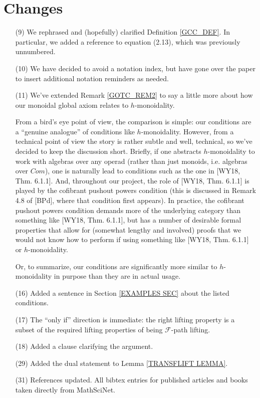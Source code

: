\documentclass[a4paper,10pt
]{article}%
\numberwithin{equation}{section}
\numberwithin{figure}{section}
\theoremstyle{definition} %
\newcommand{\F}{\ensuremath{\mathcal F}}
\newcommand{\1}{\ensuremath{\mathbbm 1}}%
\begin{document}
\section{Changes}

\begin{enumerate}
\item[(9)] We rephrased and (hopefully) clarified Definition \ref{GCC_DEF}. In particular, we added a reference to equation (2.13), which was previously unnumbered.
\item[(10)] We have decided to avoid a notation index, but have gone over the paper to insert additional notation reminders as needed.
\item[(11)] We've extended Remark \ref{GOTC_REM2} to say a little more about how our monoidal global axiom relates to 
$h$-monoidality.

From a bird's eye point of view, the comparison is simple: our conditions are a ``genuine analogue'' of conditions like $h$-monoidality. 
However, from a technical point of view the story is rather subtle and well, technical, so we've decided to keep the discussion short. 
Briefly, if one abstracts $h$-monoidality to work with 
algebras over any operad (rather than just monoids, i.e. algebras over $Com$), 
one is naturally lead to conditions such as the one
in [WY18, Thm. 6.1.1].
And, throughout our project, the role of [WY18, Thm. 6.1.1]
is played by the cofibrant pushout powers condition
(this is discussed in Remark 4.8 of [BPd], where that condition first appears).
In practice, the cofibrant pushout powers condition demands more of the underlying category than something like [WY18, Thm. 6.1.1],
but has a number of desirable formal properties that allow
for (somewhat lengthy and involved) proofs that we would not 
know how to perform if using something like 
[WY18, Thm. 6.1.1] or
$h$-monoidality.

Or, to summarize, our conditions are significantly more similar to 
$h$-monoidality in purpose than they are in actual usage.


\item[(16)] Added a sentence in Section \ref{EXAMPLES SEC} about the listed conditions.
\item[(17)] The ``only if'' direction is immediate: the right lifting property is a subset of the required lifting properties of being $\F$-path lifting.
\item[(18)] Added a clause clarifying the argument.
\item[(29)] Added the dual statement to Lemma \ref{TRANSFLIFT LEMMA}.
\item[(31)] References updated. All bibtex entries for published articles and books taken directly from MathSciNet.

\end{enumerate}
\end{document}
